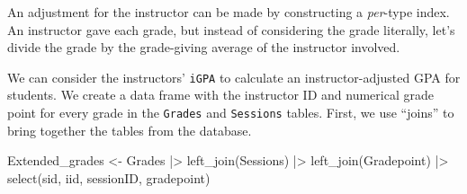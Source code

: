 \documentclass[
  letterpaper,
  DIV=11,
  numbers=noendperiod,
  oneside]{scrartcl}
\newenvironment{Shaded}{\begin{snugshade}}{\end{snugshade}}
\newcommand{\FunctionTok}[1]{\textcolor[rgb]{0.28,0.35,0.67}{#1}}
\newcommand{\NormalTok}[1]{\textcolor[rgb]{0.00,0.23,0.31}{#1}}
\newcommand{\OtherTok}[1]{\textcolor[rgb]{0.00,0.23,0.31}{#1}}
\newcommand{\SpecialCharTok}[1]{\textcolor[rgb]{0.37,0.37,0.37}{#1}}
\begin{document}
An adjustment for the instructor can be made by constructing a
\emph{per}-type index. An instructor gave each grade, but instead of
considering the grade literally, let's divide the grade by the
grade-giving average of the instructor involved.


We can consider the instructors' \texttt{iGPA} to calculate an
instructor-adjusted GPA for students. We create a data frame with the
instructor ID and numerical grade point for every grade in the
\texttt{Grades} and \texttt{Sessions} tables. First, we use ``joins'' to
bring together the tables from the database.

\begin{Shaded}
\begin{Highlighting}[]
\NormalTok{Extended\_grades }\OtherTok{\textless{}{-}}\NormalTok{ Grades }\SpecialCharTok{|\textgreater{}} 
  \FunctionTok{left\_join}\NormalTok{(Sessions) }\SpecialCharTok{|\textgreater{}}
  \FunctionTok{left\_join}\NormalTok{(Gradepoint) }\SpecialCharTok{|\textgreater{}}
  \FunctionTok{select}\NormalTok{(sid, iid, sessionID, gradepoint)}
\end{Highlighting}
\end{Shaded}
\end{document}

